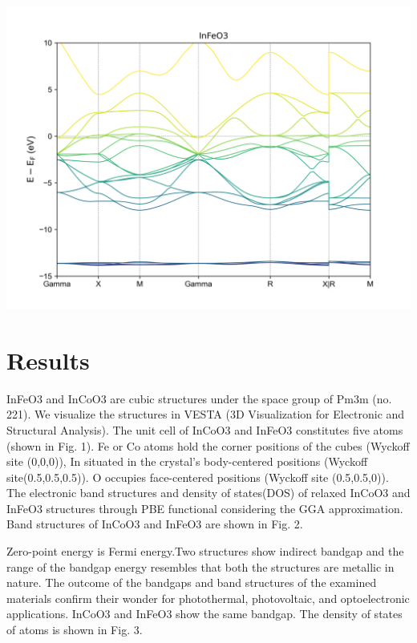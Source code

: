 \documentclass[12pt, letterpaper]{article}
\newcommand*{\1}{\hspace{1pt}}
\begin{document}
    \begin{adjustbox}{center,caption={Band Structure Of InFeO3},label={somelabel},nofloat=figure,vspace=\bigskipamount}
        \includegraphics[width=\textwidth]{bandFe}
    \end{adjustbox}

    \section{Results}
    InFeO3 and InCoO3 are cubic structures under the space group of Pm3m (no. 221). We visualize the structures in VESTA (3D Visualization for Electronic and 
    Structural Analysis). The unit cell of InCoO3 and InFeO3 constitutes five atoms (shown in Fig. 1). Fe or Co atoms hold the corner positions of the cubes (Wyckoff 
    site (0,0,0)), In situated in the crystal's body-centered positions (Wyckoff site(0.5,0.5,0.5)). O occupies face-centered positions (Wyckoff site (0.5,0.5,0)). 
    The electronic band structures and density of states(DOS) of relaxed InCoO3 and InFeO3 structures through PBE functional considering the GGA approximation. 
    Band structures of InCoO3 and InFeO3 are shown in Fig. 2.  


    
    Zero-point energy is Fermi energy.Two structures show indirect bandgap and the range of the bandgap 
    energy resembles that both the structures are metallic in nature. The outcome of the bandgaps and band structures of the examined materials confirm their wonder
    for photothermal, photovoltaic, and optoelectronic applications. InCoO3 and InFeO3 show the same bandgap. The density of states of atoms is shown in Fig. 3.
    
\end{document}
